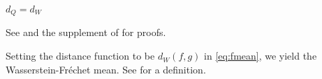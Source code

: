 \begin{lemma}
    \label{lemma:dqeqdw}
    $d_Q = d_W$
\end{lemma}
See \textcite{PetersenLiuDivani2021} and the supplement of \textcite{PetersenMüller2016}
for proofs.

Setting the distance function to be $d_W(f, g)$ in \ref{eq:fmean}, we yield the Wasserstein-Fréchet mean.
See \textcite{PetersenLiuDivani2021} for a definition.

